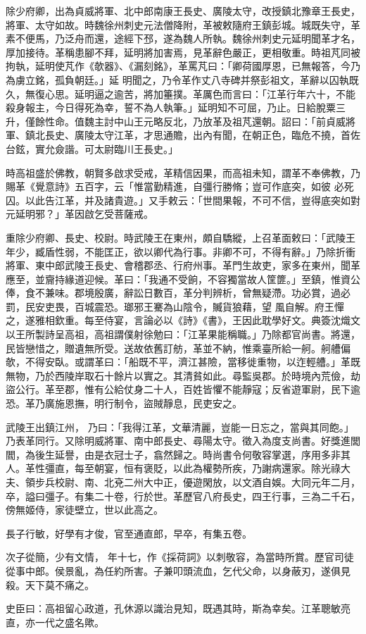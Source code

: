 \begin{pinyinscope}
 除少府卿，出為貞威將軍、北中郎南康王長史、廣陵太守，改授鎮北豫章王長史，將軍、太守如故。時魏徐州刺史元法僧降附，革被敕隨府王鎮彭城。城既失守，革素不便馬，乃泛舟而還，途經下邳，遂為魏人所執。魏徐州刺史元延明聞革才名，厚加接待。革稱患腳不拜，延明將加害焉，見革辭色嚴正，更相敬重。時祖芃同被拘執，延明使芃作《欹器》、《漏刻銘》，革罵芃曰：「卿荷國厚恩，已無報答，今乃為虜立銘，孤負朝廷。」延
 明聞之，乃令革作丈八寺碑并祭彭祖文，革辭以囚執既久，無復心思。延明逼之逾苦，將加箠撲。革厲色而言曰：「江革行年六十，不能殺身報主，今日得死為幸，誓不為人執筆。」延明知不可屈，乃止。日給脫粟三升，僅餘性命。值魏主討中山王元略反北，乃放革及祖芃還朝。詔曰：「前貞威將軍、鎮北長史、廣陵太守江革，才思通贍，出內有聞，在朝正色，臨危不撓，首佐台鉉，實允僉諧。可太尉臨川王長史。」



 時高祖盛於佛教，朝賢多啟求受戒，革精信因果，而高祖未知，謂革不奉佛教，乃賜革《覺意詩》五百字，云「惟當勤精進，自彊行勝脩；豈可作底突，如彼
 必死囚。以此告江革，并及諸貴遊。」又手敕云：「世間果報，不可不信，豈得底突如對元延明邪？」革因啟乞受菩薩戒。



 重除少府卿、長史、校尉。時武陵王在東州，頗自驕縱，上召革面敕曰：「武陵王年少，臧盾性弱，不能匡正，欲以卿代為行事。非卿不可，不得有辭。」乃除折衝將軍、東中郎武陵王長史、會稽郡丞、行府州事。革門生故吏，家多在東州，聞革應至，並齎持緣道迎候。革曰：「我通不受餉，不容獨當故人筐篚。」至鎮，惟資公俸，食不兼味。郡境殷廣，辭訟日數百，革分判辨析，曾無疑滯。功必賞，過必罰，民安吏畏，百城震恐。瑯邪王騫為山陰令，贓貨狼藉，望
 風自解。府王憚之，遂雅相欽重。每至侍宴，言論必以《詩》《書》，王因此耽學好文。典簽沈熾文以王所製詩呈高祖，高祖謂僕射徐勉曰：「江革果能稱職。」乃除都官尚書。將還，民皆戀惜之，贈遺無所受。送故依舊訂舫，革並不納，惟乘臺所給一舸。舸艚偏欹，不得安臥。或謂革曰：「船既不平，濟江甚險，當移徙重物，以迮輕艚。」革既無物，乃於西陵岸取石十餘片以實之。其清貧如此。尋監吳郡。於時境內荒儉，劫盜公行。革至郡，惟有公給仗身二十人，百姓皆懼不能靜寇；反省遊軍尉，民下逾恐。革乃廣施恩撫，明行制令，盜賊靜息，民吏安之。



 武陵王出鎮江州，
 乃曰：「我得江革，文華清麗，豈能一日忘之，當與其同飽。」乃表革同行。又除明威將軍、南中郎長史、尋陽太守。徵入為度支尚書。好獎進閭閻，為後生延譽，由是衣冠士子，翕然歸之。時尚書令何敬容掌選，序用多非其人。革性彊直，每至朝宴，恒有褒貶，以此為權勢所疾，乃謝病還家。除光祿大夫、領步兵校尉、南、北兗二州大中正，優遊閑放，以文酒自娛。大同元年二月，卒，謚曰彊子。有集二十卷，行於世。革歷官八府長史，四王行事，三為二千石，傍無姬侍，家徒壁立，世以此高之。



 長子行敏，好學有才俊，官至通直郎，早卒，有集五卷。



 次子從簡，少有文情，
 年十七，作《採荷詞》以刺敬容，為當時所賞。歷官司徒從事中郎。侯景亂，為任約所害。子兼叩頭流血，乞代父命，以身蔽刃，遂俱見殺。天下莫不痛之。



 史臣曰：高祖留心政道，孔休源以識治見知，既遇其時，斯為幸矣。江革聰敏亮直，亦一代之盛名歟。



\end{pinyinscope}